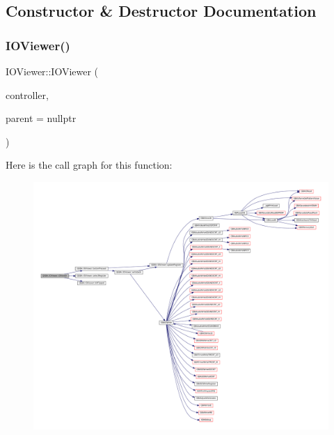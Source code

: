 \subsection{Constructor \& Destructor Documentation}
\mbox{\label{class_q_g_b_a_1_1_i_o_viewer_abfa1e40a028fd0205df542ba45c80449}} 
\subsubsection{\texorpdfstring{I\+O\+Viewer()}{IOViewer()}}
{\footnotesize\ttfamily I\+O\+Viewer\+::\+I\+O\+Viewer (\begin{DoxyParamCaption}\item[{std\+::shared\+\_\+ptr$<$ \mbox{\hyperlink{class_q_g_b_a_1_1_core_controller}{Core\+Controller}} $>$}]{controller,  }\item[{Q\+Widget $\ast$}]{parent = {\ttfamily nullptr} }\end{DoxyParamCaption})}

Here is the call graph for this function\+:
\nopagebreak
\begin{figure}[H]
\begin{center}
\leavevmode
\includegraphics[width=350pt]{class_q_g_b_a_1_1_i_o_viewer_abfa1e40a028fd0205df542ba45c80449_cgraph}
\end{center}
\end{figure}


